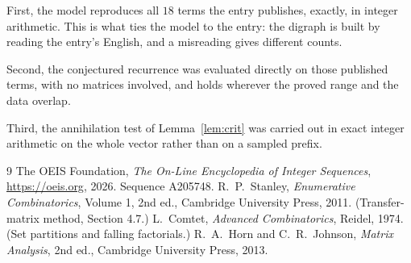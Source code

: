 \documentclass[11pt,a4paper]{article}
\theoremstyle{plain}
\theoremstyle{definition}
\begin{document}
First, the model reproduces all $18$ terms the entry publishes, exactly, in integer
arithmetic. This is what ties the model to the entry: the digraph is built by reading the
entry's English, and a misreading gives different counts.

Second, the conjectured recurrence was evaluated directly on those published terms, with no
matrices involved, and holds wherever the proved range and the data overlap.

Third, the annihilation test of Lemma~\ref{lem:crit} was carried out in exact integer
arithmetic on the whole vector rather than on a sampled prefix.

\begin{thebibliography}{9}
 The OEIS Foundation, \emph{The On-Line Encyclopedia of Integer
Sequences}, \url{https://oeis.org}, 2026. Sequence A205748.
 R.~P.~Stanley, \emph{Enumerative Combinatorics}, Volume 1, 2nd ed.,
Cambridge University Press, 2011. (Transfer-matrix method, Section 4.7.)
 L.~Comtet, \emph{Advanced Combinatorics}, Reidel, 1974. (Set partitions
and falling factorials.)
 R.~A.~Horn and C.~R.~Johnson, \emph{Matrix Analysis}, 2nd ed., Cambridge
University Press, 2013.
\end{thebibliography}
\end{document}
